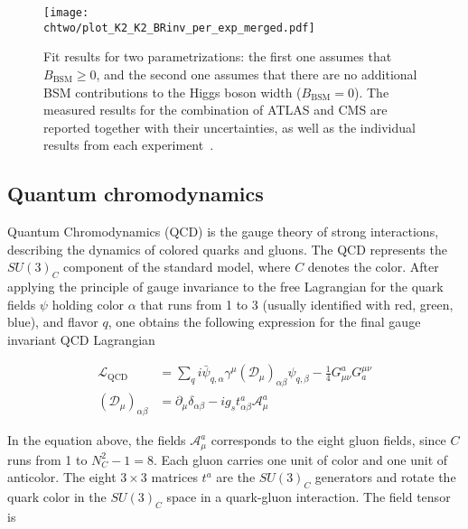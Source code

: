   \begin{figure}[!htb]
  \centering
  \texttt{[image: \\chtwo/plot\_K2\_K2\_BRinv\_per\_exp\_merged.pdf]}
  \caption{Fit results for two parametrizations: the first one assumes that $B_\mathrm{BSM} \geq 0$, and the second one assumes that there are no additional BSM contributions to the Higgs boson width ($B_\mathrm{BSM} = 0$). The measured results for the combination of ATLAS and CMS are reported together with their uncertainties, as well as the individual results from each experiment~\cite{Aad:2015zhl}.}
  \label{fig:HiggsCoupl}
\end{figure} 

\subsection{Quantum chromodynamics}\label{subsec:QCD}

Quantum Chromodynamics (QCD) is the gauge theory of strong interactions, describing the dynamics of colored quarks and gluons.
The QCD represents the $SU(3)_C$ component of the standard model, where $C$ denotes the color.
After applying the principle of gauge invariance to the free Lagrangian for the quark fields $\psi$ holding color $\alpha$ that runs from 1 to 3 (usually identified with red, green, blue), and flavor $q$, one obtains the following expression for the final gauge invariant QCD Lagrangian

\begin{equation}\label{eqn:SM_e46}
\begin{split}
\mathcal{L}_\mathrm{QCD} & = \sum_{q} i\bar{\psi}_{q,\alpha} \gamma^\mu(\mathcal{D}_\mu)_{\alpha\beta}\psi_{q,\beta} - \frac{1}{4}G^a_{\mu\nu}G^{\mu\nu}_a\\
(\mathcal{D}_\mu)_{\alpha\beta} & = \partial_\mu\delta_{\alpha\beta} - ig_st^a_{\alpha\beta}\mathcal{A}_\mu^a
\end{split}
\end{equation}

In the equation above, the fields $\mathcal{A}^a_\mu$ corresponds to the eight gluon fields, since $C$ runs from 1 to $N^2_C - 1 = 8$.
Each gluon carries one unit of color and one unit of anticolor.
The eight $3\times3$ matrices $t^a$ are the $SU(3)_C$ generators and rotate the quark color in the $SU(3)_C$ space in a quark-gluon interaction.
The field tensor is

